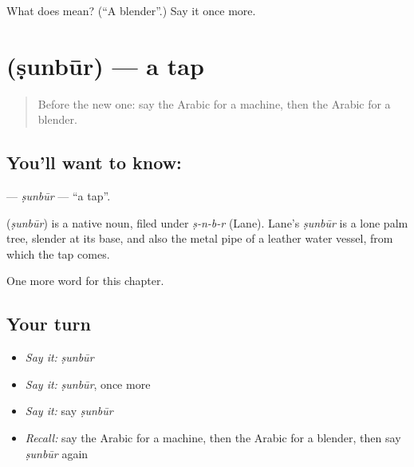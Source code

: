 \begin{tcolorbox}[breakable,colback=teal!4,colframe=teal!35!black,title={Before you move on}]
What does  mean? (\textquotedblleft{}A blender\textquotedblright{}.) Say it once more.
\end{tcolorbox}
\section[\texorpdfstring{\ar{صنبور} (ṣunbūr)}{صنبور (ṣunbūr)}]{ (ṣunbūr) — a tap}

\label{lesson:AR-C187-sunbur}



\begin{quote}
Before the new one: say the Arabic for a machine, then the Arabic for a blender.
\end{quote}

\subsection*{You'll want to know: }
\textbf{} — \emph{ṣunbūr} — \textquotedblleft{}a tap\textquotedblright{}.

\begin{cousinweb}
\textbf{} (\emph{ṣunbūr}) is a native noun, filed under \emph{ṣ-n-b-r} (Lane). Lane's \emph{ṣunbūr} is a lone palm tree, slender at its base, and also the metal pipe of a leather water vessel, from which the tap comes.
\end{cousinweb}

\begin{grammarlens}[title={What you've built}]
One more word for this chapter.
\end{grammarlens}

\subsection*{Your turn}
\begin{itemize}
\raggedright
  \item \emph{Say it:} \emph{ṣunbūr}
  \item \emph{Say it:} \emph{ṣunbūr}, once more
  \item \emph{Say it:} say \emph{ṣunbūr}
  \item \emph{Recall:} say the Arabic for a machine, then the Arabic for a blender, then say \emph{ṣunbūr} again
\end{itemize}


